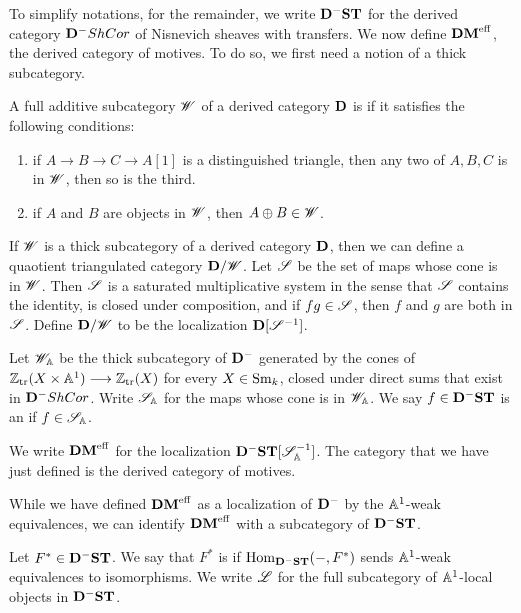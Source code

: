 To simplify notations, for the remainder, we write $\DShCor$ for 
the derived category $\DCat^-\ShCor$ of Nisnevich sheaves with 
transfers. We now define $\DMeff$, the derived category of 
motives. To do so, we first need a notion of a thick subcategory.

\begin{defn}
A full additive subcategory $\Cat{W}$ of a derived category 
$\DCat$ is  if it satisfies the following conditions:
\begin{enumerate}
\item if $A \to B \to C \to A[1]$ is a distinguished triangle, then
any two of $A, B, C$ is in $\Cat{W}$, then so is the third.

\item if $A$ and $B$ are objects in $\Cat{W}$, then $A \oplus B \in
\Cat{W}$.
\end{enumerate}
\end{defn}

If $\Cat{W}$ is a thick subcategory of a derived category $\DCat$,
then we can define a quaotient triangulated category 
$\DCat/\Cat{W}$. Let $\Cat{S}$ be the set of maps whose cone is in 
$\Cat{W}$. Then $\Cat{S}$ is a saturated multiplicative system in 
the sense that $\Cat{S}$ contains the identity, is closed under 
composition, and if $fg \in \Cat{S}$, then $f$ and $g$ are both in 
$\Cat{S}$. Define $\DCat/\Cat{W}$ to be the localization 
$\DCat[D] [\Cat{S}^{-1}]$.

\begin{defn}\label{def_DMeff}
Let $\Cat{W}_{\A}$ be the thick subcategory of $\DCat^-$ generated 
by the cones of $\Ztr(X \times \A^1) \to \Ztr(X)$ for every $X \in 
\Sm$, closed under direct sums that exist in $\DCat^-\ShCor$. 
Write $\Cat{S}_{\A}$ for the maps whose cone is in $\Cat{W}_{\A}$. 
We say $f \in \DShCor$ is an  if $f 
\in \Cat{S}_{\A}$.

We write $\DMeff$ for the localization 
$\DShCor [\Cat{S}_{\A}^{-1}]$. The category that we have
just defined is the derived category of motives.
\end{defn}

While we have defined $\DMeff$ as a localization of 
$\DCat^-$ by the $\A^1$-weak equivalences, we can identify
$\DMeff$ with a subcategory of $\DShCor$.

\begin{defn}
Let $F^* \in \DShCor$. We say that $F^*$ is  if
$\hom_{\DShCor}(-, F^*)$ sends $\A^1$-weak equivalences to 
isomorphisms. We write $\ALocal$ for the full subcategory of 
$\A^1$-local objects in $\DShCor$.
\end{defn}


